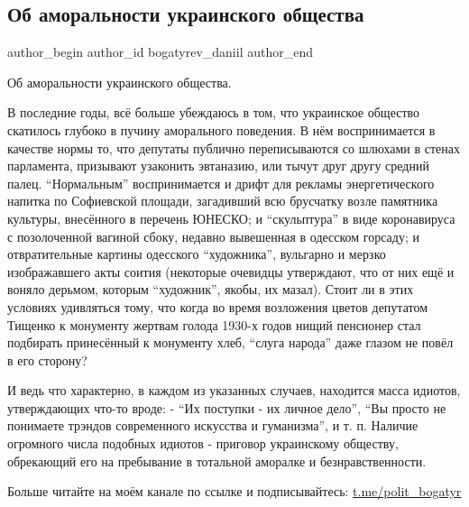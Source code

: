  
 
 
 
 
 
\subsection{Об аморальности украинского общества}
\label{sec:28_11_2021.fb.bogatyrev_daniil.1.obschestvo_amoralnost}
 
\ifcmt
 author_begin
   author_id bogatyrev_daniil
 author_end
\fi

Об аморальности украинского общества.

В последние годы, всё больше убеждаюсь в том, что украинское общество скатилось
глубоко в пучину аморального поведения. В нём воспринимается в качестве нормы
то, что депутаты публично переписываются со шлюхами в стенах парламента,
призывают узаконить эвтаназию, или тычут друг другу средний палец. \enquote{Нормальным}
воспринимается и дрифт для рекламы энергетического напитка по Софиевской
площади, загадивший всю брусчатку возле памятника культуры, внесённого в
перечень ЮНЕСКО; и \enquote{скульптура} в виде коронавируса с позолоченной вагиной
сбоку, недавно вывешенная в одесском горсаду; и отвратительные картины
одесского \enquote{художника}, вульгарно и мерзко изображавшего акты соития (некоторые
очевидцы утверждают, что от них ещё и воняло дерьмом, которым \enquote{художник},
якобы, их мазал). Стоит ли в этих условиях удивляться тому, что когда во время
возложения цветов депутатом Тищенко к монументу жертвам голода 1930-х годов
нищий пенсионер стал подбирать принесённый к монументу хлеб, \enquote{слуга народа}
даже глазом не повёл в его сторону?

И ведь что характерно, в каждом из указанных случаев, находится масса идиотов,
утверждающих что-то вроде: - \enquote{Их поступки - их личное дело}, \enquote{Вы просто не
понимаете трэндов современного искусства и гуманизма}, и т. п. Наличие
огромного числа подобных идиотов - приговор украинскому обществу, обрекающий
его на пребывание в тотальной аморалке и безнравственности.

Больше читайте на моём канале по ссылке и подписывайтесь: \url{t.me/polit_bogatyr}

